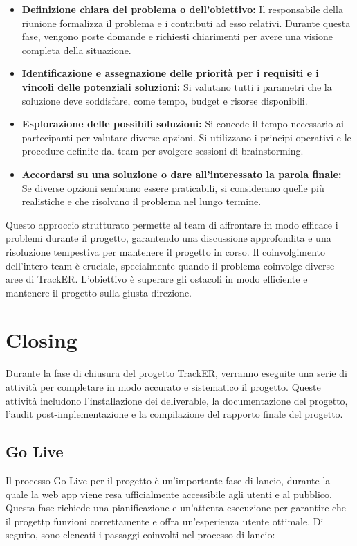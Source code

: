 \documentclass[oneside]{book}
\begin{document}
\begin{itemize}
    \item \textbf{Definizione chiara del problema o dell'obiettivo:} Il responsabile della riunione formalizza il problema e i contributi ad esso relativi. Durante questa fase, vengono poste domande e richiesti chiarimenti per avere una visione completa della situazione.

    \item \textbf{Identificazione e assegnazione delle priorità per i requisiti e i vincoli delle potenziali soluzioni:} Si valutano tutti i parametri che la soluzione deve soddisfare, come tempo, budget e risorse disponibili.

    \item \textbf{Esplorazione delle possibili soluzioni:} Si concede il tempo necessario ai partecipanti per valutare diverse opzioni. Si utilizzano i principi operativi e le procedure definite dal team per svolgere sessioni di brainstorming.

    \item \textbf{Accordarsi su una soluzione o dare all'interessato la parola finale:} Se diverse opzioni sembrano essere praticabili, si considerano quelle più realistiche e che risolvano il problema nel lungo termine.
\end{itemize}

Questo approccio strutturato permette al team di affrontare in modo efficace i problemi durante il progetto, garantendo una discussione approfondita e una risoluzione tempestiva per mantenere il progetto in corso. Il coinvolgimento dell'intero team è cruciale, specialmente quando il problema coinvolge diverse aree di TrackER. L'obiettivo è superare gli ostacoli in modo efficiente e mantenere il progetto sulla giusta direzione.

\chapter{Closing}
Durante la fase di chiusura del progetto TrackER, verranno eseguite una serie di attività per completare in modo accurato e sistematico il progetto. Queste attività includono l'installazione dei deliverable, la documentazione del progetto, l'audit post-implementazione e la compilazione del rapporto finale del progetto.

\section{Go Live}
Il processo Go Live per il progetto è un'importante fase di lancio, durante la quale la web app viene resa ufficialmente accessibile agli utenti e al pubblico. Questa fase richiede una pianificazione e un'attenta esecuzione per garantire che il progettp funzioni correttamente e offra un'esperienza utente ottimale. Di seguito, sono elencati i passaggi coinvolti nel processo di lancio:
\end{document}

